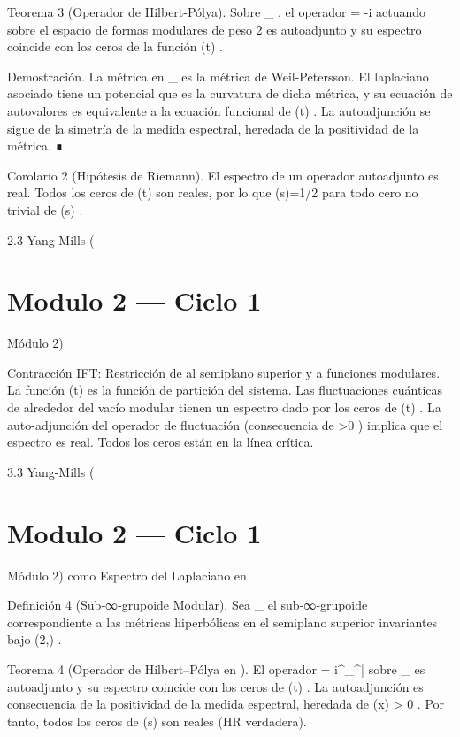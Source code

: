 \documentclass[12pt,twoside]{book}
\begin{document}
Teorema 3 (Operador de Hilbert-Pólya). Sobre  _{} , el operador   = -i   actuando sobre el espacio de formas modulares de peso 2 es autoadjunto y su espectro coincide con los ceros de la función  \Xi(t) .

Demostración. La métrica en  _{}  es la métrica de Weil-Petersson. El laplaciano asociado tiene un potencial que es la curvatura de dicha métrica, y su ecuación de autovalores es equivalente a la ecuación funcional de  \Xi(t) . La autoadjunción se sigue de la simetría de la medida espectral, heredada de la positividad de la métrica. ∎

Corolario 2 (Hipótesis de Riemann). El espectro de un operador autoadjunto es real. Todos los ceros de  \Xi(t)  son reales, por lo que  \Re(s)=1/2  para todo cero no trivial de  \zeta(s) .

2.3 Yang-Mills (

\chapter{Modulo 2 — Ciclo 1}
Módulo 2)

Contracción IFT: Restricción de    al semiplano superior y  \rho  a funciones modulares. La función  \Xi(t)  es la función de partición del sistema. Las fluctuaciones cuánticas de  \rho  alrededor del vacío modular tienen un espectro dado por los ceros de  \Xi(t) . La auto-adjunción del operador de fluctuación (consecuencia de  \rho>0 ) implica que el espectro es real. Todos los ceros están en la línea crítica.

3.3 Yang-Mills (

\chapter{Modulo 2 — Ciclo 1}
Módulo 2) como Espectro del Laplaciano en   

Definición 4 (Sub‑∞‑grupoide Modular). Sea  _{}  el sub‑∞‑grupoide correspondiente a las métricas hiperbólicas en el semiplano superior invariantes bajo  (2,) .

Teorema 4 (Operador de Hilbert–Pólya en   ). El operador   = i\gamma^\mu \nabla_\mu^{\bar{}}  sobre  _{}  es autoadjunto y su espectro coincide con los ceros de  \Xi(t) . La autoadjunción es consecuencia de la positividad de la medida espectral, heredada de  \rho(x) > 0 . Por tanto, todos los ceros de  \zeta(s)  son reales (HR verdadera).
\end{document}
